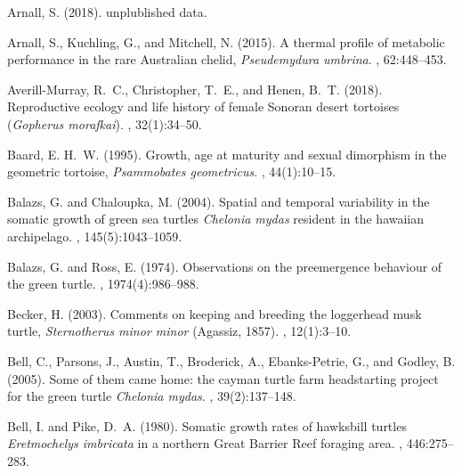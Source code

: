 \documentclass{article}
\begin{document}
\clearpage
\begin{thebibliography}{}

Arnall, S. (2018).
\newblock unplublished data.

Arnall, S., Kuchling, G., and Mitchell, N. (2015).
\newblock A thermal profile of metabolic performance in the rare {A}ustralian
  chelid, \emph{Pseudemydura umbrina}.
, 62:448--453.

Averill-Murray, R.~C., Christopher, T.~E., and Henen, B.~T. (2018).
\newblock Reproductive ecology and life history of female {S}onoran desert
  tortoises (\emph{Gopherus morafkai}).
, 32(1):34--50.

Baard, E. H.~W. (1995).
\newblock Growth, age at maturity and sexual dimorphism in the geometric
  tortoise, \emph{Psammobates geometricus}.
,
  44(1):10--15.

Balazs, G. and Chaloupka, M. (2004).
\newblock Spatial and temporal variability in the somatic growth of green sea
  turtles \emph{Chelonia mydas} resident in the hawaiian archipelago.
, 145(5):1043--1059.

Balazs, G. and Ross, E. (1974).
\newblock Observations on the preemergence behaviour of the green turtle.
, 1974(4):986--988.

Becker, H. (2003).
\newblock Comments on keeping and breeding the loggerhead musk turtle,
  \emph{Sternotherus minor minor} ({A}gassiz, 1857).
, 12(1):3--10.

Bell, C., Parsons, J., Austin, T., Broderick, A., Ebanks-Petrie, G., and
  Godley, B. (2005).
\newblock Some of them came home: the cayman turtle farm headstarting project
  for the green turtle \emph{Chelonia mydas}.
, 39(2):137--148.

Bell, I. and Pike, D.~A. (1980).
\newblock Somatic growth rates of hawksbill turtles \emph{Eretmochelys
  imbricata} in a northern {G}reat {B}arrier {R}eef foraging area.
, 446:275--283.


\end{thebibliography}
\end{document}
